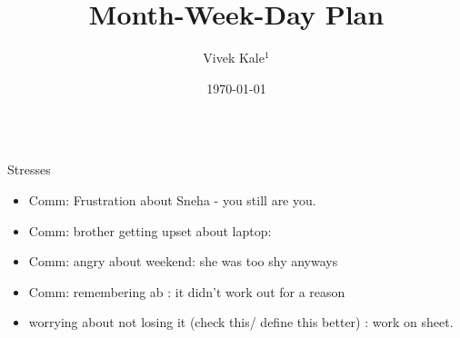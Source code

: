 \documentclass[serif, mathserif, final]{beamer}
\title{Month-Week-Day Plan}
\author{Vivek Kale$^1$}
\institute{$^1$ University of Illinois at Urbana-Champaign}
\date{\today}
\begin{document}
 
\begin{frame}{} 
  \begin{columns}
\begin{column}{0.25\linewidth} %
  \begin{block}{ Stresses} 
    \begin{itemize}
    \tiny \item \tiny Comm: Frustration about Sneha - you still are you.
    \item \tiny Comm: brother getting upset about laptop: 
    \item \tiny Comm: angry about weekend: she was too shy anyways

    \item \tiny Comm: remembering ab : it didn't work out for a reason 
    \item \tiny worrying about not losing it (check this/ define this better) : work on sheet. 
    \end{itemize} 
  \end{block} 
  

\end{column}
\end{columns}
\end{frame}
\end{document}
